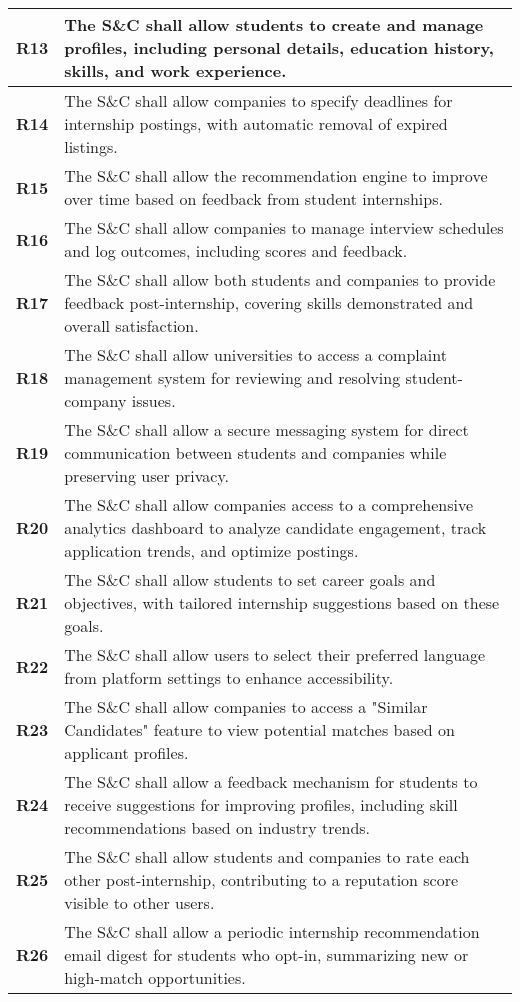 \begin{longtable}{|p{}|p{}|}
\textbf{R13} & The S\&C shall allow students to create and manage profiles, including personal details, education history, skills, and work experience. \\ 
\hline
\textbf{R14} & The S\&C shall allow companies to specify deadlines for internship postings, with automatic removal of expired listings. \\ 
\hline
\textbf{R15} & The S\&C shall allow the recommendation engine to improve over time based on feedback from student internships. \\ 
\hline
\textbf{R16} & The S\&C shall allow companies to manage interview schedules and log outcomes, including scores and feedback. \\ 
\hline
\textbf{R17} & The S\&C shall allow both students and companies to provide feedback post-internship, covering skills demonstrated and overall satisfaction. \\ 
\hline
\textbf{R18} & The S\&C shall allow universities to access a complaint management system for reviewing and resolving student-company issues. \\ 
\hline
\textbf{R19} & The S\&C shall allow a secure messaging system for direct communication between students and companies while preserving user privacy. \\ 
\hline
\textbf{R20} & The S\&C shall allow companies access to a comprehensive analytics dashboard to analyze candidate engagement, track application trends, and optimize postings. \\ 
\hline
\textbf{R21} & The S\&C shall allow students to set career goals and objectives, with tailored internship suggestions based on these goals. \\ 
\hline
\textbf{R22} & The S\&C shall allow users to select their preferred language from platform settings to enhance accessibility. \\ 
\hline
\textbf{R23} & The S\&C shall allow companies to access a "Similar Candidates" feature to view potential matches based on applicant profiles. \\ 
\hline
\textbf{R24} & The S\&C shall allow a feedback mechanism for students to receive suggestions for improving profiles, including skill recommendations based on industry trends. \\ 
\hline
\textbf{R25} & The S\&C shall allow students and companies to rate each other post-internship, contributing to a reputation score visible to other users. \\ 
\hline
\textbf{R26} & The S\&C shall allow a periodic internship recommendation email digest for students who opt-in, summarizing new or high-match opportunities. \\ 

\end{longtable}
